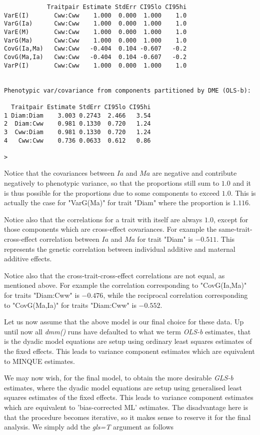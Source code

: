 \documentclass[titlepage]{article}  %
\begin{document}
\begin{verbatim}
            Traitpair Estimate StdErr CI95lo CI95hi
VarE(I)       Cww:Cww    1.000  0.000  1.000    1.0
VarG(Ia)      Cww:Cww    1.000  0.000  1.000    1.0
VarE(M)       Cww:Cww    1.000  0.000  1.000    1.0
VarG(Ma)      Cww:Cww    1.000  0.000  1.000    1.0
CovG(Ia,Ma)   Cww:Cww   -0.404  0.104 -0.607   -0.2
CovG(Ma,Ia)   Cww:Cww   -0.404  0.104 -0.607   -0.2
VarP(I)       Cww:Cww    1.000  0.000  1.000    1.0


Phenotypic var/covariance from components partitioned by DME (OLS-b):

  Traitpair Estimate StdErr CI95lo CI95hi
1 Diam:Diam    3.003 0.2743  2.466   3.54
2  Diam:Cww    0.981 0.1330  0.720   1.24
3  Cww:Diam    0.981 0.1330  0.720   1.24
4   Cww:Cww    0.736 0.0633  0.612   0.86

> 
\end{verbatim}
 
Notice that the covariances between $Ia$ and $Ma$ are negative and contribute negatively to phenotypic variance, so that the proportions still sum to $1.0$ and it is thus possible for the proportions due to some components to exceed $1.0$. This is actually the case for "VarG(Ma)" for trait "Diam" where the proportion is $1.116$.

Notice also that the correlations for a trait with itself are always $1.0$, except for those components which are cross-effect covariances. For example the same-trait-cross-effect correlation between $Ia$ and $Ma$ for trait "Diam" is $-0.511$. This represents the genetic correlation between individual additive and maternal additive effects.

Notice also that the cross-trait-cross-effect correlations are not equal, as mentioned above. For example the correlation corresponding to "CovG(Ia,Ma)" for traits "Diam:Cww" is $-0.476$, while the reciprocal correlation corresponding to "CovG(Ma,Ia)" for traits "Diam:Cww" is $-0.552$. 

Let us now assume that the above model is our final choice for these data. 
Up until now all {\em dmm()} runs have defaulted to what we term {\em OLS-b} estimates, that is the dyadic model equations are setup using ordinary least squares estimates of the fixed effects. This leads to variance component estimates which are equivalent to MINQUE estimates. 

We may now wish, for the final model, to obtain the more desirable {\em GLS-b} estimates, where the dyadic model equations are setup using generalised least squares estimates of the fixed effects.  This leads to variance component estimates which are equivalent to 'bias-corrected ML' estimates. The disadvantage here is that the procedure becomes iterative, so it makes sense to reserve it for the final analysis. We simply add the {\em gls=T} argument as follows
\end{document}
